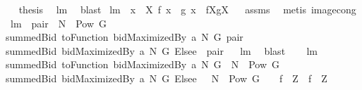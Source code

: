 \begin{isabellebody}
\isamarkupfalse%
\ \isamarkupfalse%
\ {\isacharquery}thesis\ \isamarkupfalse%
\ lm{}{}\ \isamarkupfalse%
\ blast\isanewline
{}\isamarkupfalse%
%
\endisatagproof
{\isafoldproof}%
%
\isadelimproof
%
\endisadelimproof
\isanewline
\isanewline
{}\isamarkupfalse%
\ lm{}{}{\isacharcolon}\ \ {\isachardoublequoteopen}{\isasymforall}x\ {\isasymin}\ X{\isachardot}\ f\ x\ {\isacharequal}\ g\ x{\isachardoublequoteclose}\ \ {\isachardoublequoteopen}f{\isacharbackquote}X{\isacharequal}g{\isacharbackquote}X{\isachardoublequoteclose}%
\isadelimproof
\ %
\endisadelimproof
%
\isatagproof
{}\isamarkupfalse%
\ assms\ \isamarkupfalse%
\ {\isacharparenleft}metis\ image{\isacharunderscore}cong{\isacharparenright}%
\endisatagproof
{\isafoldproof}%
%
\isadelimproof
%
\endisadelimproof
\isanewline
\isanewline
{}\isamarkupfalse%
\ lm{}{}{\isacharcolon}\ {\isachardoublequoteopen}{\isasymforall}\ pair\ {\isasymin}\ N\ {\isasymtimes}\ {\isacharparenleft}Pow\ G\ {\isacharminus}\ {\isacharbraceleft}{\isacharbraceleft}{\isacharbraceright}{\isacharbraceright}{\isacharparenright}{\isachardot}\ \ \isanewline
summedBid\ {\isacharparenleft}toFunction\ {\isacharparenleft}bidMaximizedBy\ a\ N\ G{\isacharparenright}{\isacharparenright}\ pair\ {\isacharequal}\ \isanewline
summedBid\ {\isacharparenleft}{\isacharparenleft}bidMaximizedBy\ a\ N\ G{\isacharparenright}\ Elsee\ {}{\isacharparenright}\ pair{\isachardoublequoteclose}%
\isadelimproof
\ %
\endisadelimproof
%
\isatagproof
{}\isamarkupfalse%
\ lm{}{}\ \isanewline
{}\isamarkupfalse%
\ blast%
\endisatagproof
{\isafoldproof}%
%
\isadelimproof
%
\endisadelimproof
\ \ \isanewline
\isanewline
{}\isamarkupfalse%
\ lm{}{}{\isacharcolon}\ \isanewline
{\isachardoublequoteopen}{\isacharparenleft}summedBid\ {\isacharparenleft}toFunction\ {\isacharparenleft}bidMaximizedBy\ a\ N\ G{\isacharparenright}{\isacharparenright}{\isacharparenright}\ {\isacharbackquote}\ {\isacharparenleft}N\ {\isasymtimes}\ {\isacharparenleft}Pow\ G\ {\isacharminus}\ {\isacharbraceleft}{\isacharbraceleft}{\isacharbraceright}{\isacharbraceright}{\isacharparenright}{\isacharparenright}{\isacharequal}\isanewline
{\isacharparenleft}summedBid\ {\isacharparenleft}{\isacharparenleft}bidMaximizedBy\ a\ N\ G{\isacharparenright}\ Elsee\ {}{\isacharparenright}{\isacharparenright}\ {\isacharbackquote}\ {\isacharparenleft}N\ {\isasymtimes}\ {\isacharparenleft}Pow\ G\ {\isacharminus}\ {\isacharbraceleft}{\isacharbraceleft}{\isacharbraceright}{\isacharbraceright}{\isacharparenright}{\isacharparenright}{\isachardoublequoteclose}\ {\isacharparenleft}\ {\isachardoublequoteopen}{\isacharquery}f{}\ {\isacharbackquote}\ {\isacharquery}Z\ {\isacharequal}\ {\isacharquery}f{}\ {\isacharbackquote}\ {\isacharquery}Z{\isachardoublequoteclose}{\isacharparenright}\isanewline

\end{isabellebody}
